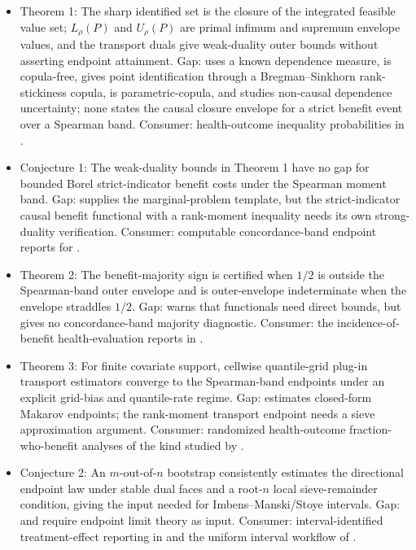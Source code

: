 \documentclass[11pt]{article}
\theoremstyle{definition}
\theoremstyle{plain}
\theoremstyle{remark}
\begin{document}
\begin{itemize}[leftmargin=*]
\item Theorem 1: The sharp identified set is the closure of the integrated feasible value set; \(L_\rho(P)\) and \(U_\rho(P)\) are primal infimum and supremum envelope values, and the transport duals give weak-duality outer bounds without asserting endpoint attainment.  Gap: \citet{FanPark2009DTEConfidenceSets} uses a known dependence measure, \citet{FanPark2010DTEBounds} is copula-free, \citet{Liang2026RankStickiness} gives point identification through a Bregman--Sinkhorn rank-stickiness copula, \citet{HeLi2026OrdinalCopula} is parametric-copula, and \citet{BartlKupperLuxPapapantoleon2022Dependence} studies non-causal dependence uncertainty; none states the causal closure envelope for a strict benefit event over a Spearman band.  Consumer: health-outcome inequality probabilities in \citet{Mullahy2018InequalityProbability}.
\item Conjecture 1: The weak-duality bounds in Theorem 1 have no gap for bounded Borel strict-indicator benefit costs under the Spearman moment band.  Gap: \citet{Kellerer1984Duality} supplies the marginal-problem template, but the strict-indicator causal benefit functional with a rank-moment inequality needs its own strong-duality verification.  Consumer: computable concordance-band endpoint reports for \citet{Mullahy2018InequalityProbability}.
\item Theorem 2: The benefit-majority sign is certified when \(1/2\) is outside the Spearman-band outer envelope and is outer-envelope indeterminate when the envelope straddles \(1/2\).  Gap: \citet{FirpoRidder2019Functionals} warns that functionals need direct bounds, but gives no concordance-band majority diagnostic.  Consumer: the incidence-of-benefit health-evaluation reports in \citet{Mullahy2018InequalityProbability}.
\item Theorem 3: For finite covariate support, cellwise quantile-grid plug-in transport estimators converge to the Spearman-band endpoints under an explicit grid-bias and quantile-rate regime.  Gap: \citet{FanPark2010DTEBounds} estimates closed-form Makarov endpoints; the rank-moment transport endpoint needs a sieve approximation argument.  Consumer: randomized health-outcome fraction-who-benefit analyses of the kind studied by \citet{HuangFangHanleyRosenblum2019FractionBenefit}.
\item Conjecture 2: An \(m\)-out-of-\(n\) bootstrap consistently estimates the directional endpoint law under stable dual faces and a root-\(n\) local sieve-remainder condition, giving the input needed for Imbens--Manski/Stoye intervals.  Gap: \citet{ImbensManski2004PartialCI} and \citet{Stoye2009MoreCI} require endpoint limit theory as input.  Consumer: interval-identified treatment-effect reporting in \citet{Mullahy2018InequalityProbability} and the uniform interval workflow of \citet{Stoye2009MoreCI}.
\end{itemize}
\end{document}
